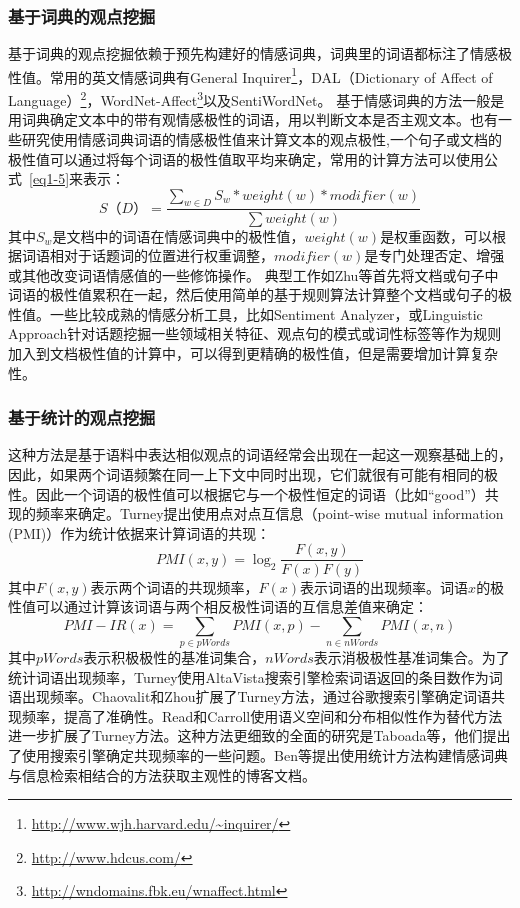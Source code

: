 \subsubsection{基于词典的观点挖掘}
基于词典的观点挖掘依赖于预先构建好的情感词典，词典里的词语都标注了情感极性值。常用的英文情感词典有General Inquirer\footnote{\url{http://www.wjh.harvard.edu/~inquirer/}}，DAL（Dictionary of Affect of Language）\footnote{\url{http://www.hdcus.com/}}，WordNet-Affect\footnote{\url{http://wndomains.fbk.eu/wnaffect.html}}以及SentiWordNet。
基于情感词典的方法一般是用词典确定文本中的带有观情感极性的词语，用以判断文本是否主观文本。也有一些研究使用情感词典词语的情感极性值来计算文本的观点极性,一个句子或文档的极性值可以通过将每个词语的极性值取平均来确定，常用的计算方法可以使用公式~\ref{eq1-5}来表示：
\begin{equation}
\label{eq1-5}
S（D）=\dfrac{\sum_{w \in D}S_w \ast weight(w) \ast modifier(w)}{\sum weight(w)}
\end{equation}
其中$ S_w $是文档中的词语在情感词典中的极性值，$ weight(w) $是权重函数，可以根据词语相对于话题词的位置进行权重调整，$ modifier(w) $是专门处理否定、增强或其他改变词语情感值的一些修饰操作。
典型工作如Zhu等首先将文档或句子中词语的极性值累积在一起，然后使用简单的基于规则算法计算整个文档或句子的极性值。一些比较成熟的情感分析工具，比如Sentiment Analyzer，或Linguistic Approach针对话题挖掘一些领域相关特征、观点句的模式或词性标签等作为规则加入到文档极性值的计算中，可以得到更精确的极性值，但是需要增加计算复杂性。

\subsubsection{基于统计的观点挖掘}
这种方法是基于语料中表达相似观点的词语经常会出现在一起这一观察基础上的，因此，如果两个词语频繁在同一上下文中同时出现，它们就很有可能有相同的极性。因此一个词语的极性值可以根据它与一个极性恒定的词语（比如“good”）共现的频率来确定。Turney提出使用点对点互信息（point-wise mutual information (PMI)）作为统计依据来计算词语的共现：
\begin{equation}
PMI(x,y)=\log_2\dfrac{F(x,y)}{F(x)F(y)}
\end{equation}
其中$ F(x,y) $表示两个词语的共现频率，$ F(x) $表示词语的出现频率。词语$ x $的极性值可以通过计算该词语与两个相反极性词语的互信息差值来确定：
\begin{equation}
PMI-IR(x)=\sum_{p \in pWords}PMI(x,p)-\sum_{n \in nWords}PMI(x,n)
\end{equation}
其中$ pWords $表示积极极性的基准词集合，$ nWords $表示消极极性基准词集合。为了统计词语出现频率，Turney使用AltaVista搜索引擎检索词语返回的条目数作为词语出现频率。Chaovalit和Zhou扩展了Turney方法，通过谷歌搜索引擎确定词语共现频率，提高了准确性。Read和Carroll使用语义空间和分布相似性作为替代方法进一步扩展了Turney方法。这种方法更细致的全面的研究是Taboada等，他们提出了使用搜索引擎确定共现频率的一些问题。Ben等提出使用统计方法构建情感词典与信息检索相结合的方法获取主观性的博客文档。

